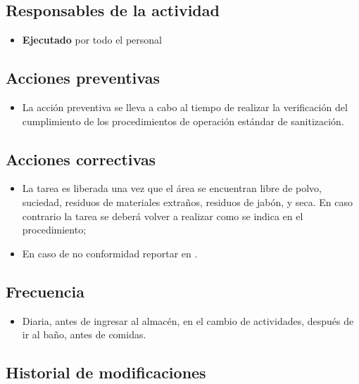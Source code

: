 \subsection{Responsables de la actividad}

\begin{itemize}
	\item \textbf{Ejecutado} por todo el personal
\end{itemize}

\subsection{Acciones preventivas}

\begin{itemize}
	\item La acción preventiva se lleva a cabo al tiempo de realizar la verificación del cumplimiento de los procedimientos de operación estándar de sanitización.
\end{itemize}

\subsection{Acciones correctivas}

\begin{itemize}
	\item La tarea es liberada una vez que el área se encuentran libre de polvo, suciedad, residuos de materiales extraños, residuos de jabón, y seca. En caso contrario la tarea se deberá volver a realizar como se indica en el procedimiento;
	\item En caso de no conformidad reportar en \RAC.
\end{itemize}

\subsection{Frecuencia}

\begin{itemize}
	\item Diaria, antes de ingresar al almacén, en el cambio de actividades, después de ir al baño, antes de comidas.
\end{itemize}

\subsection{Historial de modificaciones}

